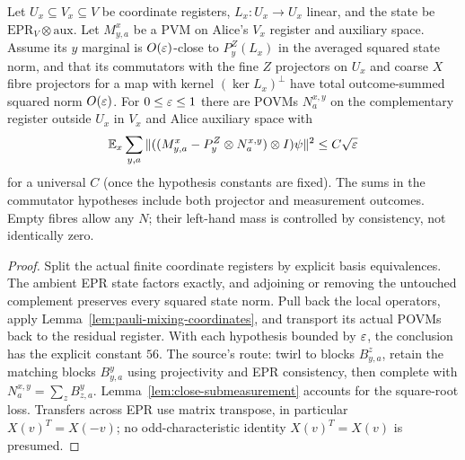 \begin{lemma}
\label{lem:pauli-mixing}
\leanok
{}
Let $U_x\subseteq V_x\subseteq V$ be coordinate registers, $L_x:U_x\to U_x$
linear, and the state be $\mathrm{EPR}_V\otimes\mathrm{aux}$.
Let $M^x_{y,a}$ be a PVM on Alice's $V_x$ register and auxiliary space.
Assume its $y$ marginal is $O(\varepsilon)$-close to $P_y^Z(L_x)$ in the
averaged squared state norm, and that its commutators with the fine $Z$
projectors on $U_x$ and coarse $X$ fibre projectors for a map with kernel
$(\ker L_x)^\perp$ have total outcome-summed squared norm $O(\varepsilon)$.
For $0\leq\varepsilon\leq1$ there are POVMs $N_a^{x,y}$ on the complementary
register outside $U_x$ in $V_x$ and Alice auxiliary space with
\[
 \mathbb E_x\sum_{y,a}
 \|((M^x_{y,a}-P_y^Z\otimes N_a^{x,y})\otimes I)\psi\|^2
 \leq C\sqrt{\varepsilon}
\]
for a universal $C$ (once the hypothesis constants are fixed).
The sums in the commutator hypotheses include both projector and measurement
outcomes. Empty fibres allow any $N$; their left-hand mass is controlled by
consistency, not identically zero.
\end{lemma}

\begin{proof}
\leanok
Split the actual finite coordinate registers by explicit basis equivalences.
The ambient EPR state factors exactly, and adjoining or removing the untouched
complement preserves every squared state norm. Pull back the local operators,
apply Lemma~\ref{lem:pauli-mixing-coordinates}, and transport its actual POVMs
back to the residual register. With each hypothesis bounded by $\varepsilon$, the
conclusion has the explicit constant $56$.
The source's route: twirl to blocks $B^z_{y,a}$, retain the matching blocks $B^y_{y,a}$ using
projectivity and EPR consistency, then complete with
$N_a^{x,y}=\sum_z B^y_{z,a}$. Lemma~\ref{lem:close-submeasurement}
accounts for the square-root loss. Transfers across EPR use matrix transpose,
in particular $X(v)^T=X(-v)$; no odd-characteristic identity $X(v)^T=X(v)$
is presumed.
\end{proof}

